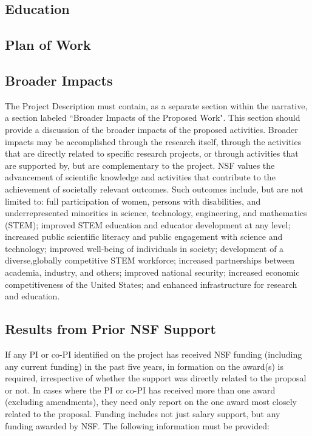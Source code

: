 \subsection{Education }

\subsection{Plan of Work }


\subsection{Broader Impacts }
The Project Description must contain, as a separate section within the narrative, a section labeled ``Broader
Impacts of the Proposed Work". This section should provide a discussion of the broader impacts of the proposed
activities. Broader impacts may be accomplished through the research itself, through the activities that are
directly related to specific research projects, or through activities that are supported by, but are complementary to
the project. NSF values the advancement of scientific knowledge and activities that contribute to the
achievement of societally relevant outcomes. Such outcomes include, but are not limited to: full
participation of women, persons with disabilities, and underrepresented minorities in science, technology, engineering, and
mathematics (STEM); improved STEM education and educator development at any level; increased public
scientific literacy and public engagement with science and technology; improved well-being of individuals in
society; development of a diverse,globally competitive STEM workforce; increased partnerships between
academia, industry, and others; improved national security; increased economic competitiveness of the United
States; and enhanced infrastructure for research and education.

\subsection{Results from Prior NSF Support }
If any PI or co-PI identified on the project has received NSF funding (including any current
funding) in the past five years, in formation on the award(s) is required,
irrespective of whether the support was directly related to the proposal or not.
In cases where the PI or co-PI has received more than one award (excluding amendments),
they need only report on the one award most closely related to the proposal. Funding includes not just salary
support, but any funding awarded by NSF. The following information must be provided:\\

